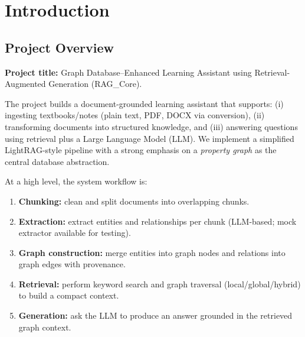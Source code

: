 \setcounter{section}{1}
\section{Introduction}

\subsection{Project Overview}
\textbf{Project title:} Graph Database--Enhanced Learning Assistant using Retrieval-Augmented Generation (RAG\_Core).

The project builds a document-grounded learning assistant that supports: (i) ingesting textbooks/notes (plain text, PDF, DOCX via conversion), (ii) transforming documents into structured knowledge, and (iii) answering questions using retrieval plus a Large Language Model (LLM). We implement a simplified LightRAG-style pipeline \cite{guo2024lightrag} with a strong emphasis on a \textit{property graph} as the central database abstraction.

At a high level, the system workflow is:
\begin{enumerate}
	\item \textbf{Chunking:} clean and split documents into overlapping chunks.
	\item \textbf{Extraction:} extract entities and relationships per chunk (LLM-based; mock extractor available for testing).
	\item \textbf{Graph construction:} merge entities into graph nodes and relations into graph edges with provenance.
	\item \textbf{Retrieval:} perform keyword search and graph traversal (local/global/hybrid) to build a compact context.
	\item \textbf{Generation:} ask the LLM to produce an answer grounded in the retrieved graph context.
\end{enumerate}

